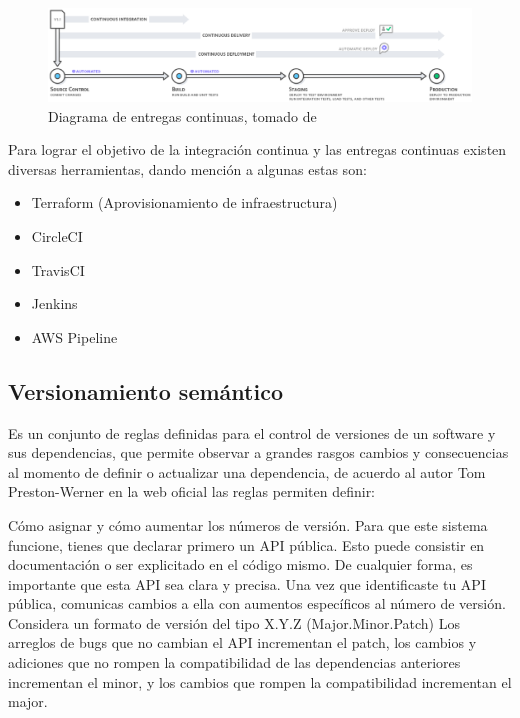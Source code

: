 \begin{figure}[H]
    \centering
    \includegraphics[width=\linewidth]{bibliografia/Imagenes/awsEC.eps}
    \caption{Diagrama de entregas continuas, tomado de \cite{awsEC}}
\end{figure}

Para lograr el objetivo de la integración continua y las entregas continuas existen diversas herramientas, dando mención a algunas estas son:

\begin{itemize}
    \item Terraform (Aprovisionamiento de infraestructura)
    \item CircleCI
    \item TravisCI
    \item Jenkins
    \item AWS Pipeline
\end{itemize}

\subsection{Versionamiento semántico}

Es un conjunto de reglas definidas para el control de versiones de un software y sus dependencias, que permite observar a grandes rasgos cambios y consecuencias al momento de definir o actualizar una dependencia, de acuerdo al autor Tom Preston-Werner en la web oficial \cite{semver} las reglas permiten definir:

Cómo asignar y cómo aumentar los números de versión. Para que este sistema funcione, tienes que declarar primero un API pública. Esto puede consistir en documentación o ser explicitado en el código mismo. De cualquier forma, es importante que esta API sea clara y precisa. Una vez que identificaste tu API pública, comunicas cambios a ella con aumentos específicos al número de versión. Considera un formato de versión del tipo X.Y.Z (Major.Minor.Patch) Los arreglos de bugs que no cambian el API incrementan el patch, los cambios y adiciones que no rompen la compatibilidad de las dependencias anteriores incrementan el minor, y los cambios que rompen la compatibilidad incrementan el major.

